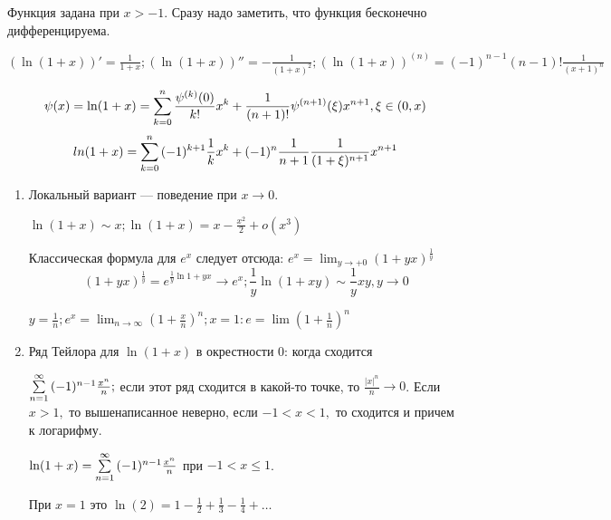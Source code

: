 \documentclass[12pt]{report}
\begin{document}
\begin{st}

Функция задана при $x > -1$. Сразу надо заметить, что функция бесконечно дифференцируема. 

$\left(\ln(1 + x)\right)' = \frac{1}{1 + x}; \left(\ln(1 + x)\right)'' = -\frac{1}{(1 + x)^2}; \left(\ln(1 + x)\right)^{(n)} = (-1)^{n - 1}(n - 1)!\frac{1}{(x + 1)^n}$

$$\psi(x) = \ln(1 + x) = \sum\limits_{k = 0}^n{\frac{\psi^{(k)}(0)}{k!}x^k} + \frac{1}{(n + 1)!}\psi^{(n + 1)}(\xi)x^{n + 1}, \xi \in (0, x)$$
$$ln(1 + x) = \sum\limits_{k = 0}^n{(-1)^{k + 1}\frac{1}{k}x^k} + (-1)^n\frac{1}{n + 1}\frac{1}{(1 + \xi)^{n + 1}}x^{n + 1}$$

\begin{enumerate}
\item Локальный вариант --- поведение при $x \to 0$.

$\ln(1 + x) \sim x; \ln(1 + x) = x - \frac{x^2}{2} + o(x^3)$

Классическая формула для $e^x$ следует отсюда: $e^x = \lim_{y \to +0}{(1 + yx)^{\frac{1}{y}}}$
$$(1 + yx)^{\frac{1}{y}} = e^{\frac{1}{y}\ln{1 + yx}} \to e^x; \frac{1}{y}\ln{(1 + xy)} \sim \frac{1}{y}xy, y \to 0$$

$y = \frac{1}{n}; e^x = \lim_{n \to \infty}{(1 + \frac{x}{n})^n}; x = 1: e = \lim{(1 + \frac{1}{n})^n}$

\item Ряд Тейлора для $\ln(1 + x)$ в окрестности $0$: когда сходится

$\sum\limits_{n = 1}^\infty{(-1)^{n - 1}\frac{x^n}{n}};$ если этот ряд сходится в какой-то точке, то $\frac{|x|^n}{n} \to 0$. Если $x > 1,$ то вышенаписанное неверно, если $-1 < x < 1,$ то сходится и причем к логарифму.

\begin{thm}
$\ln(1 + x) = \sum\limits_{n = 1}^\infty{(-1)^{n - 1}\frac{x^n}{n}}$ при $-1 < x \le 1$.
\end{thm}

\begin{note}
При $x = 1$ это $\ln(2) = 1 - \frac{1}{2} + \frac{1}{3} - \frac{1}{4} + \dots$
\end{note}
\end{enumerate}
\end{st}
\end{document}

